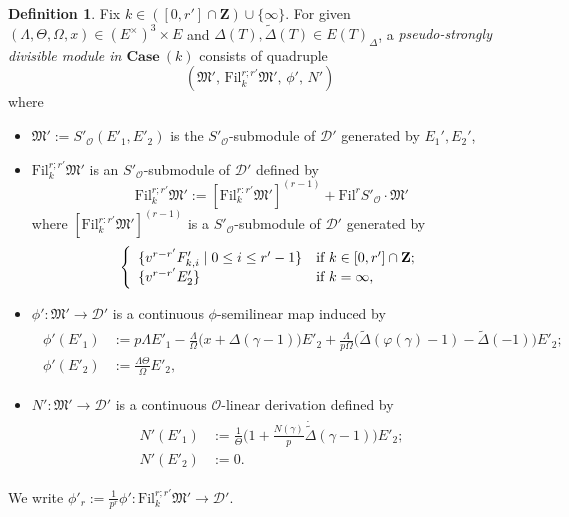 \documentclass[11pt]{amsart}
\theoremstyle{definition}
\numberwithin{equation}{subsection}
\theoremstyle{plain}
\theoremstyle{plain}
\theoremstyle{plain}
\theoremstyle{plain}
\theoremstyle{plain}
\theoremstyle{plain}
\theoremstyle{plain}
\theoremstyle{plain}
\theoremstyle{plain}
\theoremstyle{plain}
\theoremstyle{plain}
\theoremstyle{plain}
\theoremstyle{definition}
\newtheorem{defi}[equation]{Definition}
\theoremstyle{definition}
\theoremstyle{definition}
\theoremstyle{remark}
\renewcommand{\(}{\textup{(}}
\renewcommand{\)}{\textup{)}}
\newcommand{\Z}{\mathbf{Z}}
\newcommand{\fM}{\mathfrak{M}}
\newcommand{\Fil}{\mathrm{Fil}}
\newcommand{\cD}{\mathcal{D}}
\newcommand{\cO}{\mathcal{O}}
\begin{document}
\begin{defi}\label{defi: pseudo-sdm}
Fix $k\in ([0,r']\cap\Z)\cup\{\infty\}$. For given $(\Lambda,\Theta,\Omega,x)\in (E^\times)^3\times E$ and $\Delta(T),\tilde{\Delta}(T)\in  E(T)_\Delta$, a \emph{pseudo-strongly divisible module in $\mathbf{Case}~(k)$} consists of quadruple $$(\fM',\,\Fil^{r;r'}_{k}\fM',\,\phi',\,N')$$
where
\begin{itemize}[leftmargin=*]
\item $\fM':=S'_\cO(E'_1,E'_2)$ is the $S'_\cO$-submodule of $\cD'$ generated by $E_1',E_2'$,
\item $\Fil^{r;r'}_{k}\fM'$ is an $S'_\cO$-submodule of $\cD'$ defined by $$\Fil^{r;r'}_{k}\fM':=[\Fil^{r:r'}_{k}\fM']^{(r-1)}+\Fil^r S'_\cO\cdot \fM'$$ where $[\Fil^{r:r'}_{k}\fM']^{(r-1)}$ is a $S'_\cO$-submodule of $\cD'$ generated by 
\begin{equation}\label{eq: definition of FilfM'}
\left\{
  \begin{array}{ll}
    \{v^{r-r'}F'_{k,i}\mid 0\leq i\leq r'-1\} & \hbox{if $k\in[0,r']\cap\Z$;} \\
    \{v^{r-r'}E'_2\} & \hbox{if $k=\infty$,}
  \end{array}
\right.
\end{equation}

\item $\phi':\fM'\rightarrow\cD'$ is a continuous $\phi$-semilinear map induced by
\begin{align}\label{eq: definition of phi'}
\begin{split}
\phi'(E'_1) &:=p\Lambda E'_1 -\frac{\Lambda}{\Omega}\big(x+\Delta(\gamma-1)\big)E'_2 +\frac{\Lambda}{p\Omega}\big(\tilde\Delta(\varphi(\gamma)-1)-\tilde\Delta(-1)\big)E'_2;\\
\phi'(E'_2) &:=\frac{\Lambda\Theta}{\Omega} E'_2,
\end{split}
\end{align}
\item $N':\fM'\rightarrow \cD'$ is a continuous $\cO$-linear derivation defined by
\begin{align}\label{eq: definition of N'}
\begin{split}
N'(E'_1)&:=\frac{1}{\Theta}\bigg(1+\frac{N(\gamma)}{p}\dot{\tilde\Delta}(\gamma-1)\bigg)E'_2;\\
N'(E'_2)&:=0.
\end{split}
\end{align}
\end{itemize}
\end{defi}
We write $\phi'_r:=\frac{1}{p^r}\phi':\Fil^{r;r'}_k\fM'\rightarrow \cD'$.
\end{document}
